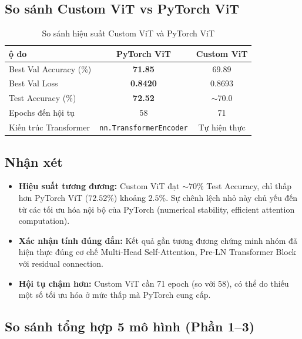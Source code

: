 \documentclass[a4paper]{article}
\newcommand{\code}[1]{\texttt{\textcolor{blue!80!black}{#1}}}
\theoremstyle{definition}
\begin{document}
\subsection{So sánh Custom ViT vs PyTorch ViT}

\begin{table}[H]
	\centering
	\caption{So sánh hiệu suất Custom ViT và PyTorch ViT}
	\begin{tabular}{|l|c|c|}
		\hline
		\textbf{\DJ ộ đo}           & \textbf{PyTorch ViT} & \textbf{Custom ViT} \\ \hline
		Best Val Accuracy (\%)     & \textbf{71.85}       & 69.89 \\ \hline
		Best Val Loss              & \textbf{0.8420}      & 0.8693 \\ \hline
		Test Accuracy (\%)         & \textbf{72.52}       & $\sim$70.0 \\ \hline
		Epochs đến hội tụ          & 58                   & 71 \\ \hline
		Kiến trúc Transformer      & \code{nn.TransformerEncoder} & Tự hiện thực \\ \hline
	\end{tabular}
	\label{tab:custom-vs-pytorch-vit}
\end{table}

\subsection{Nhận xét}
\begin{itemize}
	\item \textbf{Hiệu suất tương đương:} Custom ViT đạt $\sim 70\%$ Test Accuracy, chỉ thấp hơn PyTorch ViT ($72.52\%$) khoảng $2.5\%$. Sự chênh lệch nhỏ này chủ yếu đến từ các tối ưu hóa nội bộ của PyTorch (numerical stability, efficient attention computation).
	\item \textbf{Xác nhận tính đúng đắn:} Kết quả gần tương đương chứng minh nhóm đã hiện thực đúng cơ chế Multi-Head Self-Attention, Pre-LN Transformer Block với residual connection.
	\item \textbf{Hội tụ chậm hơn:} Custom ViT cần 71 epoch (so với 58), có thể do thiếu một số tối ưu hóa ở mức thấp mà PyTorch cung cấp.
\end{itemize}

\subsection{So sánh tổng hợp 5 mô hình (Phần 1--3)}
\end{document}
